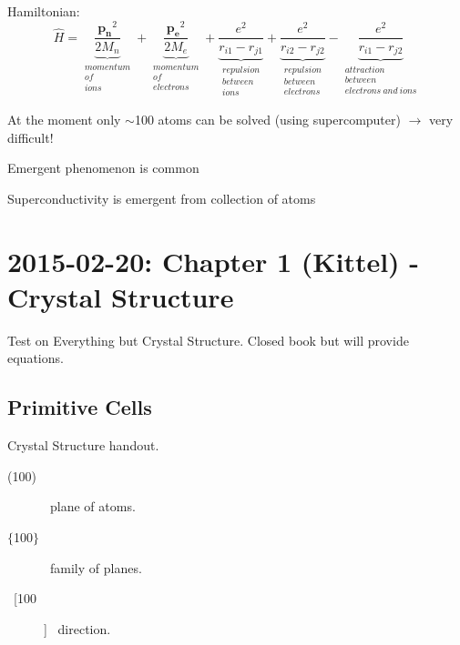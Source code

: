 \documentclass[english, 11pt]{article}
\begin{document}
		Hamiltonian:
		\begin{equation*}
				\hat{H} = \underbrace{\frac{\mathbf{p_n}^2}{2 M_n}}_{\substack{momentum\\of\\ions}} + 
							\underbrace{\frac{\mathbf{p_e}^2}{2 M_e}}_{\substack{momentum\\of\\electrons}} +
							\underbrace{\frac{e^2}{r_{i1}-r_{j1}}}_{\substack{repulsion\\between\\ions}}  + 
							\underbrace{\frac{e^2}{r_{i2}-r_{j2}}}_{\substack{repulsion\\between\\electrons}}  -
							\underbrace{\frac{e^2}{r_{i1}-r_{j2}}}_{\substack{attraction\\between\\electrons\ and\ ions}}
		\end{equation*}
		
		At the moment only $\sim$100 atoms can be solved (using supercomputer) $\rightarrow$ very difficult! \\
		\begin{description}
			\item Emergent phenomenon is common
			\begin{description}
				\item Superconductivity is emergent from collection of atoms
			\end{description}
		\end{description}
	
		\pagebreak


	\pagebreak
	


	\section{2015-02-20: Chapter 1 (Kittel) - Crystal Structure}
		Test on Everything but Crystal Structure.
		Closed book but will provide equations.
		\subsection{Primitive Cells}
			Crystal Structure handout.
			\begin{description}
				\item[(100)]  \ 
					plane of atoms.
				\item[$\{$100$\}$] \
					family of planes.
				\item[\ [100] ] \
					direction.
			\end{description}
\end{document}
